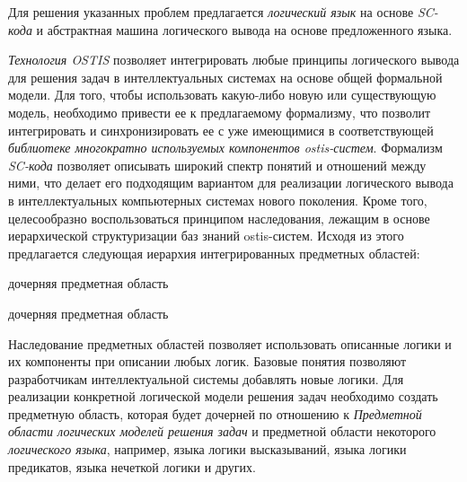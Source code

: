Для решения указанных проблем предлагается \textit{логический язык} на основе \textit{SC-кода} и абстрактная машина логического вывода на основе предложенного языка. 

\textit{Технология OSTIS} позволяет интегрировать любые принципы логического вывода для решения задач в интеллектуальных системах на основе общей формальной модели. Для того, чтобы использовать какую-либо новую или существующую модель, необходимо привести ее к предлагаемому формализму, что позволит интегрировать и синхронизировать ее с уже имеющимися в соответствующей \textit{библиотеке многократно используемых компонентов ostis-систем}. Формализм \textit{SC-кода} позволяет описывать широкий спектр понятий и отношений между ними, что делает его подходящим вариантом для реализации логического вывода в интеллектуальных компьютерных системах нового поколения. Кроме того, целесообразно воспользоваться принципом наследования, лежащим в основе иерархической структуризации баз знаний ostis-систем. Исходя из этого предлагается следующая иерархия интегрированных предметных областей:

\begin{SCn}
	\begin{scnrelfromlist}{дочерняя предметная область}
	\end{scnrelfromlist}
	
	\begin{scnindent}
	\end{scnindent}
	
	\begin{scnreltolist}{дочерняя предметная область}
	\end{scnreltolist}
\end{SCn}

Наследование предметных областей позволяет использовать описанные логики и их компоненты при описании любых логик. Базовые понятия позволяют разработчикам интеллектуальной системы добавлять новые логики. Для реализации конкретной логической модели решения задач необходимо создать предметную область, которая будет дочерней по отношению к \textit{Предметной области логических моделей решения задач} и предметной области некоторого \textit{логического языка}, например, языка логики высказываний, языка логики предикатов, языка нечеткой логики и других.

